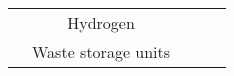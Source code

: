 \begin{landscape}
\begin{table}[]
\begin{tabular}{c|c|c|c|c}
                                                                                                 & Hydrogen                                                                                              &                                                                                                      &                                                                                              &                                                                                                                                                                                                                                                                                                                                                                                                                                                                                                                                                                                                                                                                                                                                                                                                                                                                                                                           \\
                                                                                                 & \multirow{2}{*}{Waste storage units}                                                                  &                                                                                                      &                                                                                              &                                                                                                                                                                                                                                                                                                                                                                                                                                                                                                                                                                                                                                                                                                                                                                                                                                                                                                                           \\

\end{tabular}
\end{table}
\end{landscape}
